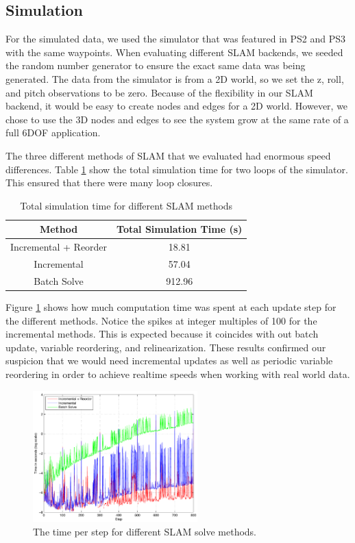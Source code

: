 \documentclass[conference]{IEEEtran}
\begin{document}
\subsection{Simulation}
\label{sub:simulation}

For the simulated data, we used the simulator that was featured in PS2 and PS3 with the
same waypoints. When evaluating different SLAM backends, we seeded the random number
generator to ensure the exact same data was being generated. The data from the simulator
is from a 2D world, so we set the z, roll, and pitch observations to be zero. Because of
the flexibility in our SLAM backend, it would be easy to create nodes and edges for a 2D
world. However, we chose to use the 3D nodes and edges to see the system grow at the same
rate of a full 6DOF application.

The three different methods of SLAM that we evaluated had enormous speed differences.
Table \ref{tab:timing} show the total simulation time for two loops of the simulator. This
ensured that there were many loop closures.

\begin{table}[!t]
\renewcommand{\arraystretch}{1.3}
\caption{Total simulation time for different SLAM methods}
\label{tab:timing}
\centering
\begin{tabular}{|c|c|}
\hline
Method & Total Simulation Time (s) \\
\hline
Incremental + Reorder & 18.81 \\
Incremental & 57.04 \\
Batch Solve & 912.96 \\
\hline
\end{tabular}
\end{table}

Figure \ref{fig:stepTime} shows how much computation time was spent at each update step
for the different methods. Notice the spikes at integer multiples of 100 for the
incremental methods. This is expected because it coincides with out batch update, variable
reordering, and relinearization. These results confirmed our suspicion that we would need
incremental updates as well as periodic variable reordering in order to achieve realtime
speeds when working with real world data.


\begin{figure}[!t]
  \centering
  \includegraphics[width=2.5in]{images/stepTimeResults}
  \caption{The time per step for different SLAM solve methods.}
  \label{fig:stepTime}
\end{figure}
\end{document}
